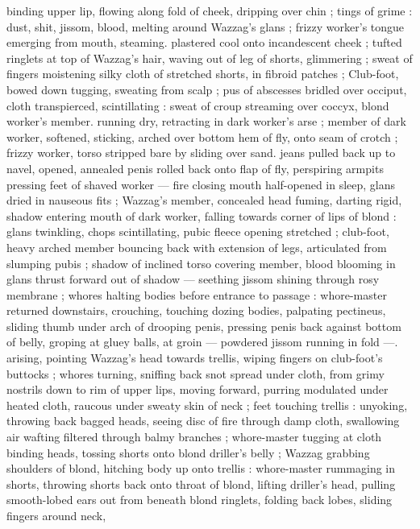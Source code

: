 {binding upper lip, flowing along fold of cheek, dripping over chin ; 
tings of grime : dust, shit, jissom, blood, melting around Wazzag's 
glans ; frizzy worker's tongue emerging from mouth, steaming. 
plastered cool onto incandescent cheek ; tufted ringlets at top of 
Wazzag's hair, waving out of leg of shorts, glimmering ; sweat of 
fingers moistening silky cloth of stretched shorts, in fibroid patches 
; Club-foot, bowed down tugging, sweating from scalp ; pus of 
abscesses bridled over occiput, cloth transpierced, scintillating : 
sweat of croup streaming over coccyx, blond worker's member. 
running dry, retracting in dark worker's arse ; member of dark 
worker, softened, sticking, arched over bottom hem of fly, onto seam 
of crotch ; frizzy worker, torso stripped bare by sliding over sand. 
jeans pulled back up to navel, opened, annealed penis rolled back 
onto flap of fly, perspiring armpits pressing feet of shaved worker --- 
fire closing mouth half-opened in sleep, glans dried in nauseous fits 
; Wazzag's member, concealed head fuming, darting rigid, shadow 
entering mouth of dark worker, falling towards corner of lips of 
blond : glans twinkling, chops scintillating, pubic fleece opening 
stretched ; club-foot, heavy arched member bouncing back with 
extension of legs, articulated from slumping pubis ; shadow of 
inclined torso covering member, blood blooming in glans thrust 
forward out of shadow --- seething jissom shining through rosy 
membrane ; whores halting bodies before entrance to passage : 
whore-master returned downstairs, crouching, touching dozing 
bodies, palpating pectineus, sliding thumb under arch of drooping 
penis, pressing penis back against bottom of belly, groping at gluey 
balls, at groin --- powdered jissom running in fold ---. arising, 
pointing Wazzag's head towards trellis, wiping fingers on club-foot's 
buttocks ; whores turning, sniffing back snot spread under cloth, 
from grimy nostrils down to rim of upper lips, moving forward, 
purring modulated under heated cloth, raucous under sweaty skin of 
neck ; feet touching trellis : unyoking, throwing back bagged heads, 
seeing disc of fire through damp cloth, swallowing air wafting filtered 
through balmy branches ; whore-master tugging at cloth binding 
heads, tossing shorts onto blond driller's belly ; Wazzag grabbing 
shoulders of blond, hitching body up onto trellis : whore-master 
rummaging in shorts, throwing shorts back onto throat of blond, 
lifting driller's head, pulling smooth-lobed ears out from beneath 
blond ringlets, folding back lobes, sliding fingers around neck, 
}
